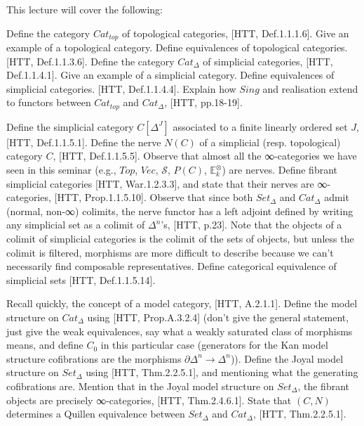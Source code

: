 \documentclass[a4paper]{amsart}
\numberwithin{figure}{section}
\theoremstyle{theorem}
\theoremstyle{definition}
\newcommand{\EE}{\mathbb{E}}
\newcommand{\grVec}{{Vec}}
\newcommand{\Sp}{{\mathcal{S}}}
\begin{document}
This lecture will cover the following: 

Define the category $Cat_{top}$ of topological categories, [HTT, Def.1.1.1.6]. %
Give an example of a topological category. %
Define equivalences of topological categories. [HTT, Def.1.1.3.6]. %
Define the category $Cat_\Delta$ of simplicial categories, [HTT, Def.1.1.4.1]. %
Give an example of a simplicial category. %
Define equivalences of simplicial categories. [HTT, Def.1.1.4.4]. %
Explain how $Sing$ and realisation extend to functors between $Cat_{top}$ and $Cat_\Delta$, [HTT, pp.18-19]. %

Define the simplicial category $C[\Delta^J]$ associated to a finite linearly ordered set $J$, [HTT, Def.1.1.5.1]. %
Define the nerve $N(C)$ of a simplicial (resp. topological) category $C$, [HTT, Def.1.1.5.5]. %
Observe that almost all the ∞-categories we have seen in this seminar (e.g., $Top$, $\grVec$, $\Sp$, $P(C)$, $\EE^\otimes_k$) are nerves. %
Define fibrant simplicial categories [HTT, War.1.2.3.3], and state that their nerves are ∞-categories, [HTT, Prop.1.1.5.10]. %
Observe that since both $Set_\Delta$ and $Cat_\Delta$ admit (normal, non-∞) colimits, the nerve functor has a left adjoint defined by writing any simplicial set as a colimit of $\Delta^n$'s, [HTT, p.23]. Note that the objects of a colimit of simplicial categories is the colimit of the sets of objects, but unless the colimit is filtered, morphisms are more difficult to describe because we can't necessarily find composable representatives. %
Define categorical equivalence of simplicial sets [HTT, Def.1.1.5.14]. %


Recall quickly, the concept of a model category, [HTT, A.2.1.1]. %
Define the model structure on $Cat_{\Delta}$ using [HTT, Prop.A.3.2.4] (don't give the general statement, just give the weak equivalences, say what a weakly saturated class of morphisms means, and define $C_0$ in this particular case (generators for the Kan model structure cofibrations are the morphisms $\partial \Delta^n \to \Delta^n$)). %
Define the Joyal model structure on $Set_\Delta$ using [HTT, Thm.2.2.5.1], and mentioning what the generating cofibrations are. %
Mention that in the Joyal model structure on $Set_\Delta$, the fibrant objects are precisely ∞-categories, [HTT, Thm.2.4.6.1]. %
State that $(C, N)$ determines a Quillen equivalence between $Set_\Delta$ and $Cat_\Delta$, [HTT, Thm.2.2.5.1]. 
\end{document}

